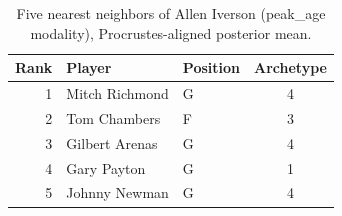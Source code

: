\begin{table}[htbp]
  \centering\small
  \begin{tabular}{rllc}
    \toprule
    Rank & Player & Position & Archetype \\
    \midrule
    1 & Mitch Richmond & G & 4 \\
    2 & Tom Chambers & F & 3 \\
    3 & Gilbert Arenas & G & 4 \\
    4 & Gary Payton & G & 1 \\
    5 & Johnny Newman & G & 4 \\
    \bottomrule
  \end{tabular}
  \caption{Five nearest neighbors of Allen Iverson (peak_age modality), Procrustes-aligned posterior mean.}
  \label{tab:Allen_Iverson_neighbors_peak_age}
\end{table}


